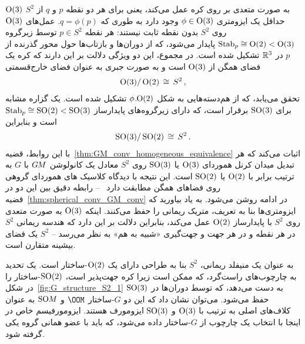 $\operatorname{O}(3)$ به صورت متعدی بر روی کره عمل می‌کند، یعنی برای هر دو نقطه $p$ و $q$ از $S^2$ حداقل یک ایزومتری $\phi\in\operatorname{O}(3)$ وجود دارد به طوری که $q = \phi(p)$.
عمل‌های $\operatorname{O}(3)$ روی $S^2$ بدون نقطه ثابت نیستند:
هر نقطه $p\in S^2$ توسط زیرگروه $\operatorname{Stab}_{p} \cong \operatorname{O}(2) < \operatorname{O}(3)$ پایدار می‌شود، که از دوران‌ها و بازتاب‌ها حول محور گذرنده از $p$ در $\mathbb{R}^3$ تشکیل شده است.
در مجموع، این دو ویژگی دلالت بر این دارند که کره یک فضای همگن از $\operatorname{O}(3)$ است و به صورت جبری به عنوان فضای خارج‌قسمتی
\begin{align}
    \operatorname{O}(3)/\operatorname{O}(2) \,\cong\, S^2 \,,
\end{align}
تحقق می‌یابد، که از هم‌دسته‌هایی به شکل ${\phi\mkern1mu.\mkern-4mu\operatorname{O}(2)}$ تشکیل شده است.
یک گزاره مشابه برای $\operatorname{SO}(3)$ برقرار است، که دارای زیرگروه‌های پایدارساز $\operatorname{Stab}_{p} \cong \operatorname{SO}(2) < \operatorname{SO}(3)$ است و بنابراین
\begin{align}
    \operatorname{SO}(3)/\operatorname{SO}(2) \,\cong\, S^2 \,.
\end{align}
با این روابط، قضیه~\ref{thm:GM_conv_homogeneous_equivalence} اثبات می‌کند که هر تبدیل میدان کرنل هموردای $\operatorname{O}(3)$ یا $\operatorname{SO}(3)$ روی $S^2$ معادل یک کانولوشن $G\mkern-1.4muM$ با $G$ به ترتیب برابر با $\operatorname{O}(2)$ یا $\operatorname{SO}(2)$ است.
این نتیجه با دیدگاه کلاسیک های هموردای گروهی روی فضاهای همگن مطابقت دارد~\cite{Cohen2019-generaltheory} -- رابطه دقیق بین این دو در قضیه~\ref{thm:spherical_conv_GM_conv} در ادامه روشن می‌شود.
به یاد بیاورید که ایزومتری‌ها بنا به تعریف، متریک ریمانی را حفظ می‌کنند.
اینکه $\operatorname{O}(3)$ به صورت متعدی روی $S^2$ با پایدارساز $\operatorname{O}(2)$ عمل می‌کند، بنابراین دلالت بر این دارد که هندسه ریمانی $S^2$ در هر نقطه و در هر جهت و جهت‌گیری «شبیه به هم» به نظر می‌رسد -- $S^2$ یک فضای بیشینه متقارن است.


به عنوان یک منیفلد ریمانی، $S^2$ بنا به طراحی دارای یک $\operatorname{O}(2)$-ساختار است.
یک تحدید به چارچوب‌های راست‌گرد، که ممکن است زیرا کره جهت‌پذیر است، $\operatorname{SO}(2)$-ساختار را در شکل~\ref{fig:G_structure_S2_1} به دست می‌دهد، که توسط دوران‌ها در $\operatorname{SO}(3)$ حفظ می‌شود.
می‌توان نشان داد که این دو $G$-ساختار $\OOM$ و $\operatorname{SO}\mkern-3.6muM$ به عنوان کلاف‌های اصلی به ترتیب با $\operatorname{O}(3)$ و $\operatorname{SO}(3)$ ایزومورف هستند.
ایزومورفیسم خاص در اینجا با انتخاب یک چارچوب از $G$-ساختار داده می‌شود، که باید با عضو همانی گروه یکی گرفته شود.

